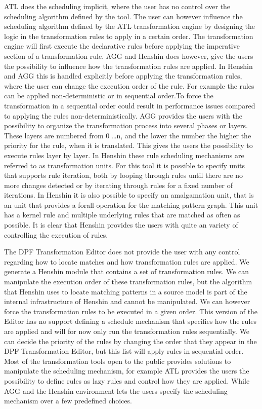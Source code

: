ATL does the scheduling implicit, where the user has no control over the
scheduling algorithm defined by the tool. The user can however influence the scheduling
algorithm defined by the ATL transformation engine by designing the logic in the
transformation rules to apply in a certain order. The transformation
engine will first execute the declarative rules before applying the imperative
section of a transformation rule. AGG and Henshin does however, give the
users the possibility to influence how the transformation rules are applied. 
In Henshin and AGG this is handled explicitly before applying the transformation
rules, where the user can change the execution order of the rule.
For example the rules can be applied non-deterministic or in sequential order.To
force the transformation in a sequential order could result in performance
issues compared to applying the rules non-deterministically. AGG provides the
users with the possibility to organize the transformation process into several
phases or layers. These layers are numbered from 0 \ldots n, and the lower the
number the higher the priority for the rule, when it is translated. This gives
the users the possibility to execute rules layer by layer. In Henshin these
rule scheduling mechanisms are referred to as transformation units. For this
tool it is possible to specify units that supports rule iteration, both by
looping through rules until there are no more changes detected or by iterating
through rules for a fixed number of iterations. In Henshin it is also possible
to specify an amalgamation unit, that is an unit that provides a
forall-operation for the matching pattern graph. This unit has a kernel rule
and multiple underlying rules that are matched as often as possible. It is
clear that Henshin provides the users with quite an variety of controlling the
execution of rules.

The DPF Transformation Editor does not provide the user with any control
regarding how to locate matches and how transformation rules are applied. We generate a
Henshin module that contains a set of transformation rules. We can manipulate
the execution order of these transformation rules, but the algorithm that
Henshin uses to locate matching patterns in a source model is part of the
internal infrastructure of Henshin and cannot be manipulated. We can however
force the transformation rules to be executed in a given order. This version of
the Editor has no support defining a schedule mechanism that specifies how the
rules are applied and will for now only run the transformation rules
sequentially. We can decide the priority of the rules by changing the order
that they appear in the DPF Transformation Editor, but this list will apply rules in
sequential order. Most of the transformation tools open to the public provides
solutions to manipulate the scheduling mechanism, for example ATL provides the
users the possibility to define rules as lazy rules and control how they are
applied. While AGG and the Henshin environment lets the users specify the
scheduling mechanism over a few predefined choices. 

